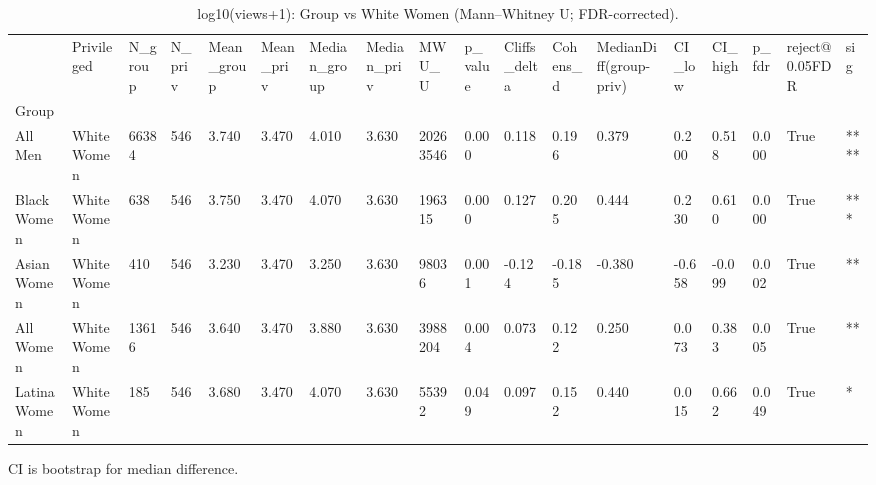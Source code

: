 \begin{table}[htbp]
\centering
\caption{log10(views+1): Group vs White Women (Mann–Whitney U; FDR-corrected).}
\label{tab:05-bias-views}
\begin{tabular}{llllllllllllllllll}
\toprule
 & Privileged & N\_group & N\_priv & Mean\_group & Mean\_priv & Median\_group & Median\_priv & MWU\_U & p\_value & Cliffs\_delta & Cohens\_d & MedianDiff(group-priv) & CI\_low & CI\_high & p\_fdr & reject@0.05FDR & sig \\
Group &  &  &  &  &  &  &  &  &  &  &  &  &  &  &  &  &  \\
\midrule
All Men & White Women & 66384 & 546 & 3.740 & 3.470 & 4.010 & 3.630 & 20263546 & 0.000 & 0.118 & 0.196 & 0.379 & 0.200 & 0.518 & 0.000 & True & **** \\
Black Women & White Women & 638 & 546 & 3.750 & 3.470 & 4.070 & 3.630 & 196315 & 0.000 & 0.127 & 0.205 & 0.444 & 0.230 & 0.610 & 0.000 & True & *** \\
Asian Women & White Women & 410 & 546 & 3.230 & 3.470 & 3.250 & 3.630 & 98036 & 0.001 & -0.124 & -0.185 & -0.380 & -0.658 & -0.099 & 0.002 & True & ** \\
All Women & White Women & 13616 & 546 & 3.640 & 3.470 & 3.880 & 3.630 & 3988204 & 0.004 & 0.073 & 0.122 & 0.250 & 0.073 & 0.383 & 0.005 & True & ** \\
Latina Women & White Women & 185 & 546 & 3.680 & 3.470 & 4.070 & 3.630 & 55392 & 0.049 & 0.097 & 0.152 & 0.440 & 0.015 & 0.662 & 0.049 & True & * \\
\bottomrule
\end{tabular}

\begin{tablenotes}[flushleft]
\item \small{CI is bootstrap for median difference.}
\end{tablenotes}
\end{table}